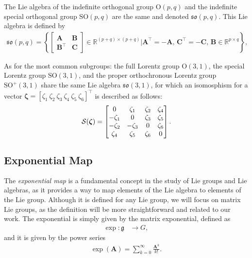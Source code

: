 \begin{example}
    The Lie algebra of the indefinite orthogonal group $\text{O}(p, q)$ and the indefinite special orthogonal group $\text{SO}(p, q)$ are the same and denoted $\mathfrak{so}(p, q)$. This Lie algebra is defined by
    \begin{align*}
        \mathfrak{so}(p, q) = \left\{
            \begin{bmatrix}
                \mathbf{A} & \mathbf{B}\\
                \mathbf{B}^\top & \mathbf{C}
            \end{bmatrix} \in \mathbb{R}^{(p+q)\times(p+q)} | \mathbf{A}^\top = -\mathbf{A},\, \mathbf{C}^\top = -\mathbf{C},\, \mathbf{B} \in \mathbb{R}^{p\times q}
        \right\},
    \end{align*}

    As for the most common subgroups: the full Lorentz group $\text{O}(3, 1)$, the special Lorentz group $\text{SO}(3, 1)$, and the proper orthochronous Lorentz group $\text{SO}^+(3, 1)$ share the same Lie algebra $\mathfrak{so}(3, 1)$, for which an isomosphism for a vector $\boldsymbol{\zeta} = [\zeta_1\ \zeta_2\ \zeta_3\ \zeta_4\ \zeta_5\ \zeta_6]^\top$ is described as follows:
    \begin{align*}
        \SL[\boldsymbol{\zeta}] = \begin{bmatrix}
            0 & \zeta_1 & \zeta_2 & \zeta_4 \\
            -\zeta_1 & 0 & \zeta_3 & \zeta_5 \\
            -\zeta_2 & -\zeta_3 & 0 & \zeta_6 \\
            \zeta_4 & \zeta_5 & \zeta_6 & 0
        \end{bmatrix}.
    \end{align*}
\end{example}
\subsection{Exponential Map}
The \emph{exponential map} is a fundamental concept in the study of Lie groups and Lie algebras, as it provides a way to map elements of the Lie algebra to elements of the Lie group. Although it is defined for any Lie group, we will focus on matrix Lie groups, as the definition will be more straightforward and related to our work. The exponential is simply given by the matrix exponential, defined as
\begin{align}
    \exp : \mathfrak{g} &\to G,
\end{align}
and it is given by the power series
\begin{align}
    \exp(\mathbf{A}) = \sum_{k=0}^\infty \frac{\mathbf{A}^k}{k!}.
\end{align}

